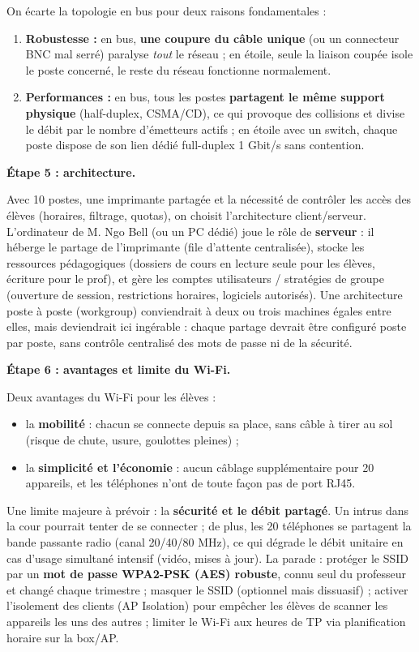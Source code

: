 \documentclass[11pt]{article}
\newcommand{\cle}[1]{{\popxbold\color{popdark}#1}}
\begin{document}
\begin{exoresolu}
On écarte la topologie en bus pour deux raisons fondamentales :
\begin{enumerate}
  \item \textbf{Robustesse :} en bus, \textbf{une coupure du câble unique} (ou un connecteur BNC mal serré) paralyse \emph{tout} le réseau ; en étoile, seule la liaison coupée isole le poste concerné, le reste du réseau fonctionne normalement.
  \item \textbf{Performances :} en bus, tous les postes \textbf{partagent le même support physique} (half-duplex, CSMA/CD), ce qui provoque des collisions et divise le débit par le nombre d'émetteurs actifs ; en étoile avec un switch, chaque poste dispose de son lien dédié full-duplex 1 Gbit/s sans contention.
\end{enumerate}

\textbf{Étape 5 : architecture.}

Avec 10 postes, une imprimante partagée et la nécessité de contrôler les accès des élèves (horaires, filtrage, quotas), on choisit l'architecture \cle{client/serveur}. L'ordinateur de M. Ngo Bell (ou un PC dédié) joue le rôle de \textbf{serveur} : il héberge le partage de l'imprimante (file d'attente centralisée), stocke les ressources pédagogiques (dossiers de cours en lecture seule pour les élèves, écriture pour le prof), et gère les comptes utilisateurs / stratégies de groupe (ouverture de session, restrictions horaires, logiciels autorisés). Une architecture poste à poste (workgroup) conviendrait à deux ou trois machines égales entre elles, mais deviendrait ici ingérable : chaque partage devrait être configuré poste par poste, sans contrôle centralisé des mots de passe ni de la sécurité.

\textbf{Étape 6 : avantages et limite du Wi-Fi.}

Deux avantages du Wi-Fi pour les élèves :
\begin{itemize}
  \item la \textbf{mobilité} : chacun se connecte depuis sa place, sans câble à tirer au sol (risque de chute, usure, goulottes pleines) ;
  \item la \textbf{simplicité et l'économie} : aucun câblage supplémentaire pour 20 appareils, et les téléphones n'ont de toute façon pas de port RJ45.
\end{itemize}
Une limite majeure à prévoir : la \textbf{sécurité et le débit partagé}. Un intrus dans la cour pourrait tenter de se connecter ; de plus, les 20 téléphones se partagent la bande passante radio (canal 20/40/80 MHz), ce qui dégrade le débit unitaire en cas d'usage simultané intensif (vidéo, mises à jour). La parade : protéger le SSID par un \textbf{mot de passe WPA2-PSK (AES) robuste}, connu seul du professeur et changé chaque trimestre ; masquer le SSID (optionnel mais dissuasif) ; activer l'isolement des clients (AP Isolation) pour empêcher les élèves de scanner les appareils les uns des autres ; limiter le Wi-Fi aux heures de TP via planification horaire sur la box/AP.


\end{exoresolu}
\end{document}
